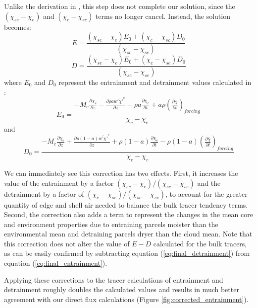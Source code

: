 \documentclass[draft,grl]{AGUTeX}
\begin{document}
\begin{article}
Unlike the derivation in \cite{Siebesma1995}, this step does not complete our 
solution, since the $(\chi_{se} - \chi_e)$ and $(\chi_c - \chi_{sc})$ terms 
no longer cancel.  Instead, the solution becomes:
\begin{equation}
  \label{eq:final_entrainment}
    E = \frac{(\chi_{sc} - \chi_e)E_0 + (\chi_c - \chi_{sc})D_0}
             {(\chi_{sc} - \chi_{se})}
\end{equation}
\begin{equation}
  \label{eq:final_detrainment}
    D = \frac{(\chi_{se} - \chi_e)E_0 + (\chi_c - \chi_{se})D_0}
             {(\chi_{sc} - \chi_{se})}
\end{equation}
where $E_0$ and $D_0$ represent the entrainment and detrainment values
calculated in \cite{Siebesma1995}:
\begin{equation}
  \label{eq:E_0_equation}
    E_0 = \frac{- M_c \frac{\partial \chi_c}{\partial z}
        - \frac{\partial \rho a \overline{w' \chi'}^c}{\partial z}
        - \rho a \frac{\partial \chi_c}{\partial t}
        + a \rho \left(\frac{\partial \bar{\chi}}{\partial t}\right)_{forcing}}
        {\chi_c - \chi_e}
\end{equation}
and
\begin{equation}
  \label{eq:D_0_equation}
    D_0 = \frac{- M_c \frac{\partial \chi_e}{\partial z}
        + \frac{\partial \rho (1 - a) \overline{w' \chi'}^e}{\partial z}
        + \rho (1-a) \frac{\partial \chi_e}{\partial t}
     - \rho (1-a) \left(\frac{\partial \bar{\chi}}{\partial t}\right)_{forcing}}
        {\chi_c - \chi_e}
\end{equation}

We can immediately see this correction has two effects.  First, it increases 
the value of the entrainment by a factor 
$(\chi_{sc} - \chi_e)/(\chi_{sc} - \chi_{se})$ and the detrainment 
by a factor of $(\chi_c - \chi_{se})/(\chi_{sc} - \chi_{se})$, to account for 
the greater quantity of edge and shell air needed to balance the bulk tracer 
tendency terms.  Second, the correction also adds a term to represent the 
changes in the mean core and environment properties due to entraining parcels 
moister than the environmental mean and detraining parcels dryer than the cloud 
mean.  Note that this correction does not alter the value of $E-D$ calculated 
for the bulk tracers, as can be easily confirmed by subtracting equation 
(\ref{eq:final_detrainment}) from equation (\ref{eq:final_entrainment}).

Applying these corrections to the tracer calculations of entrainment and 
detrainment roughly doubles the calculated values and results in much better 
agreement with our direct flux calculations (Figure 
\ref{fig:corrected_entrainment}).


\end{article}
\end{document}
